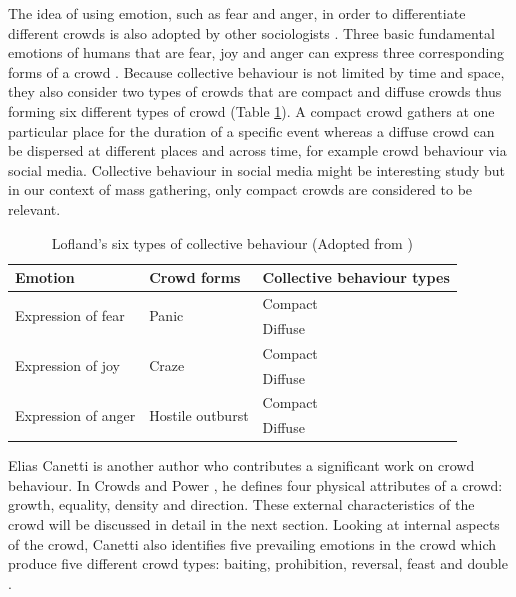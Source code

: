 The idea of using emotion, such as fear and anger, in order to differentiate different crowds is also adopted by other sociologists \citep{Lofland1985,Smelser1998}. Three basic fundamental emotions of humans that are fear, joy and anger can express three corresponding forms of a crowd \citep{Imhonopi2013}. Because collective behaviour is not limited by time and space, they also consider two types of crowds that are compact and diffuse crowds thus forming six different types of crowd (Table \ref{table:loflandCollectiveBehaviourType}). A compact crowd gathers at one particular place for the duration of a specific event whereas a diffuse crowd can be dispersed at different places and across time, for example crowd behaviour via social media. Collective behaviour in social media might be interesting study but in our context of mass gathering, only compact crowds are considered to be relevant.

\begin{table}
	\caption{Lofland's six types of collective behaviour (Adopted from \citet{FBI1967})}
	\label{table:loflandCollectiveBehaviourType}
	\centering
	\begin{tabular}{|l|l|l|}
		\hline
		\textbf{Emotion} & \textbf{Crowd forms} & \textbf{Collective behaviour types} \\ \hline \hline
		\multirow{2}{*}{Expression of fear} & \multirow{2}{*}{Panic} & Compact \\
		& & Diffuse \\ \hline
		\multirow{2}{*}{Expression of joy} & \multirow{2}{*}{Craze} & Compact \\
		& & Diffuse \\ \hline
		\multirow{2}{*}{Expression of anger} & \multirow{2}{*}{Hostile outburst} & Compact \\
		& & Diffuse \\ \hline
	\end{tabular}
\end{table}

Elias Canetti is another author who contributes a significant work on crowd behaviour. In Crowds and Power \citep{Canetti1962}, he defines four physical attributes of a crowd: growth, equality, density and direction. These external characteristics of the crowd will be discussed in detail in the next section. Looking at internal aspects of the crowd, Canetti also identifies five prevailing emotions in the crowd which produce five different crowd types: baiting, prohibition, reversal, feast and double \citep{McClelland2010}.

